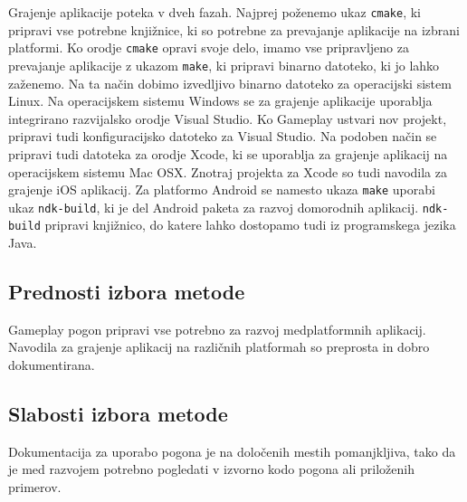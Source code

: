 Grajenje aplikacije poteka v dveh fazah. Najprej poženemo ukaz \texttt{cmake}, ki pripravi vse potrebne knjižnice, ki so potrebne za prevajanje aplikacije na izbrani platformi. Ko orodje \texttt{cmake} opravi svoje delo, imamo vse pripravljeno za prevajanje aplikacije z ukazom \texttt{make}, ki pripravi binarno datoteko, ki jo lahko zaženemo. Na ta način dobimo izvedljivo binarno datoteko za operacijski sistem Linux. Na operacijskem sistemu Windows se za grajenje aplikacije uporablja integrirano razvijalsko orodje Visual Studio. Ko Gameplay ustvari nov projekt, pripravi tudi konfiguracijsko datoteko za Visual Studio. Na podoben način se pripravi tudi datoteka za orodje Xcode, ki se uporablja za grajenje aplikacij na operacijskem sistemu Mac OSX. Znotraj projekta za Xcode so tudi navodila za grajenje iOS aplikacij. Za platformo Android se namesto ukaza \texttt{make} uporabi ukaz \texttt{ndk-build}, ki je del Android paketa za razvoj domorodnih aplikacij. \texttt{ndk-build} pripravi knjižnico, do katere lahko dostopamo tudi iz programskega jezika Java.  

\subsection{Prednosti izbora metode}

Gameplay pogon pripravi vse potrebno za razvoj medplatformnih aplikacij. Navodila za grajenje aplikacij na različnih platformah so preprosta in dobro dokumentirana.

\subsection{Slabosti izbora metode}

Dokumentacija za uporabo pogona je na določenih mestih pomanjkljiva, tako da je med razvojem potrebno pogledati v izvorno kodo pogona ali priloženih primerov. 





